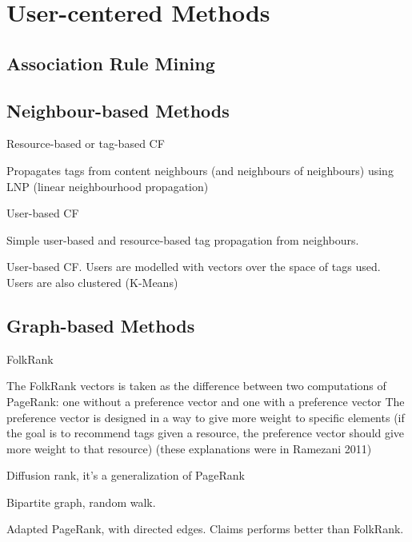 \section{User-centered Methods}\label{section:user_centered_methods}

\subsection{Association Rule Mining}

\cite{frias-martinez_etal_2008}

\subsection{Neighbour-based Methods}

\cite{jaeschke_etal_2007} Resource-based or tag-based CF

\cite{marinho_schmidt-thieme_2008}

\cite{chidlovskii_2012} Propagates tags from content neighbours (and neighbours of neighbours) using LNP (linear neighbourhood propagation)

\cite{mistry_sen_2012} User-based CF

\cite{deng_etal_2013} Simple user-based and resource-based tag propagation from neighbours.

\cite{haifeng_etal_2017} 
User-based CF. Users are modelled with vectors over the space of tags used. Users are also clustered (K-Means)

\subsection{Graph-based Methods}

\cite{jaeschke_etal_2007} FolkRank 

The FolkRank vectors is taken as the difference between two computations of PageRank: one without a preference vector and one with a preference vector
The preference vector is designed in a way to give more weight to specific elements (if the goal is to recommend tags given a resource, the preference vector should give more weight to that resource)
(these explanations were in Ramezani 2011)

\cite{si_etal_2009} Diffusion rank, it's a generalization of PageRank

\cite{liu_fang_2010} Bipartite graph, random walk.

\cite{ramezani_2011} Adapted PageRank, with directed edges. Claims performs better than FolkRank.

